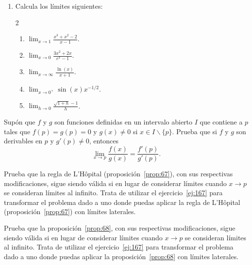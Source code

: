 \documentclass[12pt,a4paper]{book}
\begin{document}
    \begin{enumerate}[label=\arabic*.]
        \item Calcula los límites siguientes:
        \begin{multicols}{2}
        \begin{enumerate}[nosep]
            \item $\lim_{x\to 1}\frac{x^{3}+x^{2}-2}{x-1}$.
            \item $\lim_{x\to 0}\frac{3x^{2}+2x}{e^{x}-1}$.
            \item $\lim_{x\to\infty}\frac{\ln(x)}{x+1}$.
            \item $\lim_{x\to 0^{+}}\sin(x)x^{-1/2}$.
            \item $\lim_{h\to 0}\frac{\sqrt{1+h}-1}{h}$.
        \end{enumerate}
        \end{multicols}
    \end{enumerate}

    \begin{ejercicio}\label{ej:315}
        Supón que $f$ y $g$ son funciones definidas en un intervalo abierto
        $I$ que contiene a $p$ tales que $f(p)=g(p)=0$ y $g(x)\neq 0$ si $x\in I\backslash\{p\}$.
        Prueba que si $f$ y $g$ son derivables en $p$ y $g'(p)\neq 0$, entonces
        \begin{equation*}
            \lim_{x\to p}\frac{f(x)}{g(x)}=\frac{f'(p)}{g'(p)}.
        \end{equation*}
    \end{ejercicio}

    \begin{ejercicio}\label{ej:316}
        Prueba que la regla de L'Hôpital (proposición~\ref{prop:67}), con sus
        respectivas modificaciones, sigue siendo válida si en lugar de considerar límites
        cuando $x\to p$ se consideran límites al infinito. \sugerencia Trata de utilizar
        el ejercicio~\ref{ej:167} para transformar el problema dado a uno donde puedas aplicar
        la regla de L'Hôpital (proposición~\ref{prop:67}) con límites laterales.
    \end{ejercicio}

    \begin{ejercicio}\label{ej:317}
        Prueba que la proposición~\ref{prop:68}, con sus respectivas modificaciones,
        sigue siendo válida si en lugar de considerar límites cuando $x\to p$ se
        consideran límites al infinito. \sugerencia Trata de utilizar el ejercicio~\ref{ej:167}
        para transformar el problema dado a uno donde puedas aplicar la proposición~\ref{prop:68}
        con límites laterales.
    \end{ejercicio}
\end{document}
